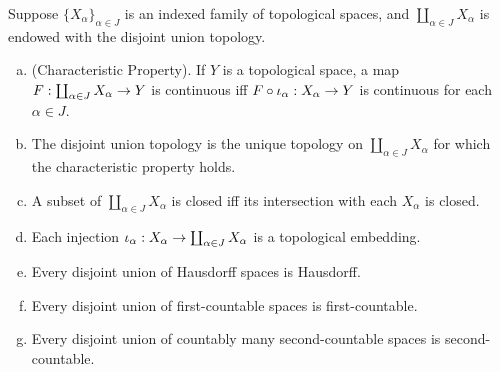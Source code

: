 \documentclass[11pt,a4paper]{article}
\begin{document}
\begin{proposition} \label{prop:disjoint_union_topology}
Suppose $\{X_\alpha\}_{\alpha\in J}$ is an indexed family of topological spaces, and $\coprod_{\alpha\in J}X_\alpha$ is endowed with the disjoint union topology.
\begin{enumerate}[(a)]
    \item (Characteristic Property). If $Y$ is a topological space, a map $F:\coprod_{\alpha\in J}X_\alpha\rightarrow Y$ is continuous iff $F\circ\iota_\alpha:X_\alpha\rightarrow Y$ is continuous for each $\alpha\in J$.
    \item The disjoint union topology is the unique topology on $\coprod_{\alpha\in J}X_\alpha$ for which the characteristic property holds.
    \item A subset of $\coprod_{\alpha\in J}X_\alpha$ is closed iff its intersection with each $X_\alpha$ is closed.
    \item Each injection $\iota_\alpha:X_\alpha\rightarrow \coprod_{\alpha\in J}X_\alpha$ is a topological embedding.
    \item Every disjoint union of Hausdorff spaces is Hausdorff.
    \item Every disjoint union of first-countable spaces is first-countable.
    \item Every disjoint union of countably many second-countable spaces is second-countable.
\end{enumerate}
\end{proposition}
\end{document}
